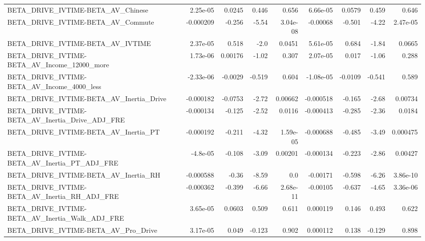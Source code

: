 \begin{tabular}{lrrrrrrrr}
BETA\_DRIVE\_IVTIME-BETA\_AV\_Chinese                  &    2.25e-05 &       0.0245 &    0.446 &    0.656 &   6.66e-05 &      0.0579 &        0.459 &         0.646 \\
BETA\_DRIVE\_IVTIME-BETA\_AV\_Commute                  &   -0.000209 &       -0.256 &    -5.54 & 3.04e-08 &   -0.00068 &      -0.501 &        -4.22 &      2.47e-05 \\
BETA\_DRIVE\_IVTIME-BETA\_AV\_IVTIME                   &    2.37e-05 &        0.518 &     -2.0 &   0.0451 &   5.61e-05 &       0.684 &        -1.84 &        0.0665 \\
BETA\_DRIVE\_IVTIME-BETA\_AV\_Income\_12000\_more        &    1.73e-06 &      0.00176 &    -1.02 &    0.307 &   2.07e-05 &       0.017 &        -1.06 &         0.288 \\
BETA\_DRIVE\_IVTIME-BETA\_AV\_Income\_4000\_less         &   -2.33e-06 &      -0.0029 &   -0.519 &    0.604 &  -1.08e-05 &     -0.0109 &       -0.541 &         0.589 \\
BETA\_DRIVE\_IVTIME-BETA\_AV\_Inertia\_Drive            &   -0.000182 &      -0.0753 &    -2.72 &  0.00662 &  -0.000518 &      -0.165 &        -2.68 &       0.00734 \\
BETA\_DRIVE\_IVTIME-BETA\_AV\_Inertia\_Drive\_ADJ\_FRE    &   -0.000134 &       -0.125 &    -2.52 &   0.0116 &  -0.000413 &      -0.285 &        -2.36 &        0.0184 \\
BETA\_DRIVE\_IVTIME-BETA\_AV\_Inertia\_PT               &   -0.000192 &       -0.211 &    -4.32 & 1.59e-05 &  -0.000688 &      -0.485 &        -3.49 &      0.000475 \\
BETA\_DRIVE\_IVTIME-BETA\_AV\_Inertia\_PT\_ADJ\_FRE       &    -4.8e-05 &       -0.108 &    -3.09 &  0.00201 &  -0.000134 &      -0.223 &        -2.86 &       0.00427 \\
BETA\_DRIVE\_IVTIME-BETA\_AV\_Inertia\_RH               &   -0.000588 &        -0.36 &    -8.59 &      0.0 &   -0.00171 &      -0.598 &        -6.26 &      3.86e-10 \\
BETA\_DRIVE\_IVTIME-BETA\_AV\_Inertia\_RH\_ADJ\_FRE       &   -0.000362 &       -0.399 &    -6.66 & 2.68e-11 &   -0.00105 &      -0.637 &        -4.65 &      3.36e-06 \\
BETA\_DRIVE\_IVTIME-BETA\_AV\_Inertia\_Walk\_ADJ\_FRE     &    3.65e-05 &       0.0603 &    0.509 &    0.611 &   0.000119 &       0.146 &        0.493 &         0.622 \\
BETA\_DRIVE\_IVTIME-BETA\_AV\_Pro\_Drive                &    3.17e-05 &        0.049 &   -0.123 &    0.902 &   0.000112 &       0.138 &       -0.129 &         0.898 \\

\end{tabular}
